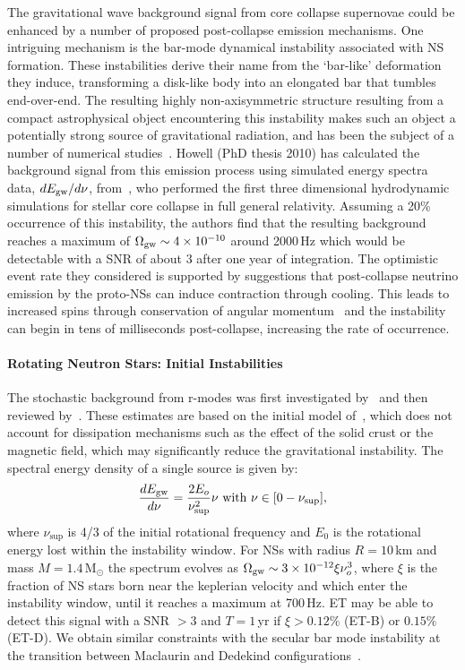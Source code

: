 The gravitational wave background signal from core collapse supernovae could be enhanced by a number of proposed post-collapse emission mechanisms. One intriguing mechanism is the bar-mode dynamical instability associated with NS formation. These instabilities derive their name from the `bar-like' deformation they induce, transforming a disk-like body into an elongated bar that tumbles end-over-end. The resulting highly non-axisymmetric structure resulting from a compact astrophysical object encountering this instability makes such an object a potentially strong source of gravitational radiation, and has been the subject of a number of numerical studies~\cite{brown00,nct00, sbs00,ssbs01,Baiotti_barmode_PRD_07}. 
Howell (PhD thesis 2010) has calculated the background signal from this emission process using simulated energy spectra data, $dE_{\rm gw}/d\nu$, from~\cite{shibata05}, who performed the first three dimensional hydrodynamic simulations for stellar core collapse in full general relativity. Assuming a 20\% occurrence of this instability, the authors find that the resulting background reaches a maximum of $\Omega_{\rm gw} \sim 4 \times 10^{-10}$ around 2000\,Hz which would be detectable with a SNR of about 3 after one year of integration. The optimistic event rate they considered is supported by suggestions that post-collapse neutrino emission by the proto-NSs can induce contraction through cooling. This leads to increased spins through conservation of angular momentum~\cite{shibata05} and the instability can begin in  tens of milliseconds post-collapse, increasing the rate of occurrence.

\paragraph{Rotating Neutron Stars: Initial Instabilities}
The stochastic background from r-modes was first investigated by~\cite{Owen1999} and then reviewed by~\cite{Ferrari:1999}. These estimates are
based on the initial model of~\cite{Lindblom:1998wf}, which does not account for
dissipation mechanisms such as the effect of the solid crust
or the magnetic field, which may significantly reduce the
gravitational instability.
The spectral energy density of a single source is given by:
\begin{equation}
\frac{dE_{\rm gw}}{d\nu }=\frac{2E_{o}}{\nu _{\sup }^2} \nu \text{ with } \nu \in \lbrack 0-\nu_{\sup}\rbrack,
\label{eq-Enj_modes}
\end{equation}
where $\nu_{\sup}$ is 4/3 of the initial rotational frequency and $E_0$ is the
rotational energy lost within the instability window.
For NSs with radius $R=10$\,km and mass $M=1.4$\,M$_\odot$ the spectrum evolves as $\Omega_{\rm gw} \sim 3 \times 10^{-12} \xi \nu_o^3$, where $\xi$ is the fraction of NS stars born near the keplerian velocity and which enter the instability window, until it reaches a maximum at 700\,Hz. ET may be able to detect this signal with a SNR $> 3$ and $T=1$\,yr if $\xi>0.12 \%$ (ET-B) or $0.15 \%$ (ET-D). We obtain similar constraints with the secular bar mode instability at the transition between Maclaurin and Dedekind configurations~\cite{Lai:1995}.
%

